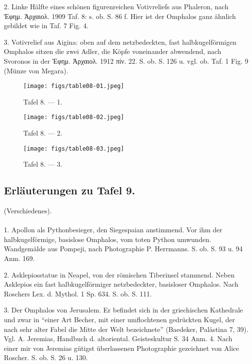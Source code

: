 \documentclass[a4paper, 11pt, oneside]{article}
\begin{document}
2. Linke Hälfte eines schönen figurenreichen Votivreliefs aus Phaleron, nach Ἐφημ. Ἀρχαιολ. 1909 Taf. 8: s. ob. S. 86 f. Hier ist der Omphalos ganz ähnlich gebildet wie in Taf. 7 Fig. 4.

3. Votivrelief aus Aigina: oben auf dem netzbedeckten, fast halbkugelförmigen Omphalos sitzen die zwei Adler, die Köpfe voneinander abwendend, nach Svoronos in der Ἐφημ. Ἀρχαιολ. 1912 πίν. 22. S. ob. S. 126 u. vgl. ob. Taf. 1 Fig. 9 (Münze von Megara).
\clearpage
\clearpage
\vspace*{\fill}
\begin{figure}[H]
\centering
\texttt{[image: figs/table08-01.jpeg]}
\caption{Tafel 8. --- 1.}
\end{figure}
\vspace*{\fill}
\clearpage
\vspace*{\fill}
\begin{figure}[H]
\centering
\texttt{[image: figs/table08-02.jpeg]}
\caption{Tafel 8. --- 2.}
\end{figure}
\vspace*{\fill}
\clearpage
\vspace*{\fill}
\begin{figure}[H]
\centering
\texttt{[image: figs/table08-03.jpeg]}
\caption{Tafel 8. --- 3.}
\end{figure}
\vspace*{\fill}
\clearpage

\subsection{Erläuterungen zu Tafel 9.}
\begin{center}
(Verschiedenes).
\end{center}
\paragraph{}
1. Apollon als Pythonbesieger, den Siegespaian anstimmend. Vor ihm der halbkugelförmige, basislose Omphalos, vom toten Python umwunden. Wandgemälde aus Pompeji, nach Photographie P. Herrmanns. S. ob. S. 93 u. 94 Anm. 169.

2. Asklepiosstatue in Neapel, von der römischen Tiberinsel stammend. Neben Asklepios ein fast halbkugelförmiger netzbedeckter, basisloser Omphalos. Nach Roschers Lex. d. Mythol. 1 Sp. 634. S. ob. S. 111.

3. Der Omphalos von Jerusalem. Er befindet sich in der griechischen Kathedrale und zwar in "`einer Art Becher, mit einer umflochtenen gedrückten Kugel, der nach sehr alter Fabel die Mitte der Welt bezeichnete"' (Baedeker, Palästina 7, 39). Vgl. A. Jeremias, Handbuch d. altoriental. Geisteskultur S. 34 Anm. 4. Nach einer mir von Jeremias gütigst überlassenen Photographie gezeichnet von Alice Roscher. S. ob. S. 26 u. 130.
\end{document}
